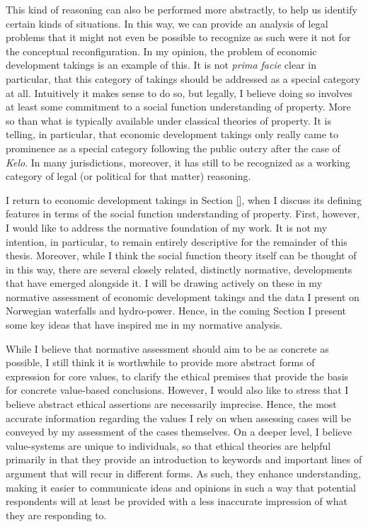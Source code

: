 This kind of reasoning can also be performed more abstractly, to help us identify certain kinds of situations. In this way, we can provide an analysis of legal problems that it might not even be possible to recognize as such were it not for the conceptual reconfiguration. In my opinion, the problem of economic development takings is an example of this. It is not {\it prima facie} clear in particular, that this category of takings should be addressed as a special category at all. Intuitively it makes sense to do so, but legally, I believe doing so involves at least some commitment to a social function understanding of property. More so than what is typically available under classical theories of property. It is telling, in particular, that economic development takings only really came to prominence as a special category following the public outcry after the case of {\it Kelo}. In many jurisdictions, moreover, it has still to be recognized as a working category of legal (or political for that matter) reasoning. 

I return to economic development takings in Section \ref{}, when I discuss its defining features in terms of the social function understanding of property. First, however, I would like to address the normative foundation of my work. It is not my intention, in particular, to remain entirely descriptive for the remainder of this thesis. Moreover, while I think the social function theory itself can be thought of in this way, there are several closely related, distinctly normative, developments that have emerged alongside it. I will be drawing actively on these in my normative assessment of economic development takings and the data I present on Norwegian waterfalls and hydro-power. Hence, in the coming Section I present some key ideas that have inspired me in my normative analysis. 

While I believe that normative assessment should aim to be as concrete as possible, I still think it is worthwhile to provide more abstract forms of expression for core values, to clarify the ethical premises that provide the basis for concrete value-based conclusions. However, I would also like to stress that I believe abstract ethical assertions are necessarily imprecise. Hence, the most accurate information regarding the values I rely on when assessing cases will be conveyed by my assessment of the cases themselves. On a deeper level, I believe value-systems are unique to individuals, so that ethical theories are helpful primarily in that they provide an introduction to keywords and important lines of argument that will recur in different forms. As such, they enhance understanding, making it easier to communicate ideas and opinions in such a way that potential respondents will at least be provided with a less inaccurate impression of what they are responding to. 

